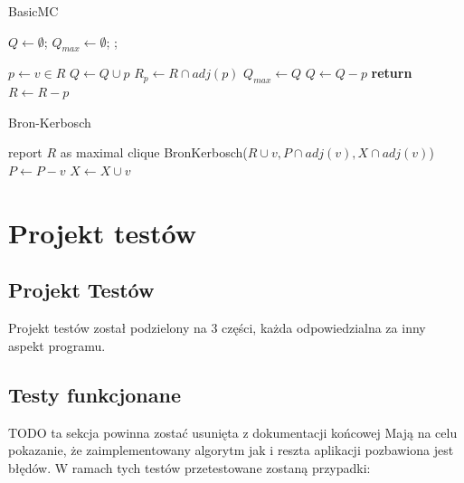 \documentclass[12pt, a4paper]{article}
\begin{document}
\begin{algorithm}
\caption{BasicMC}\label{basicmc}
\begin{algorithmic}[1]
  
\State $Q\gets \emptyset$;
\State $Q_{max}\gets \emptyset$;
\State {};
\EndProcedure
\Statex

  \State $p\gets v\in R$
    \State $Q \gets Q \cup {p}$\label{addPToQ}
    \State $R_p \gets R \cap adj(p)$
      \State {}
      \State $Q_{max} \gets Q$
    \EndIf
    \State $Q \gets Q - {p}$
  \Else
    \textbf{ return}\label{skip}
  \EndIf
  \State $R \gets R - p$
\EndWhile
\EndProcedure

\end{algorithmic}
\end{algorithm}

\begin{algorithm}
\caption{Bron-Kerbosch}\label{bron-kerbosch}
\begin{algorithmic}[1]
  
    \State report $R$ as maximal clique
  \EndIf
    \State BronKerbosch($R \cup v, P \cap adj(v), X \cap adj(v)$)
    \State $P \gets P - v$
    \State $X \gets X \cup v$
  \EndFor
\EndProcedure

\end{algorithmic}
\end{algorithm}


\section{Projekt testów}
\label{sec-4}

\subsection{Projekt Testów}
Projekt testów został podzielony na 3 części, każda odpowiedzialna za inny aspekt programu.

\subsection{Testy funkcjonane}
TODO ta sekcja powinna zostać usunięta z dokumentacji końcowej
Mają na celu pokazanie, że zaimplementowany algorytm jak i reszta aplikacji pozbawiona jest błędów. W ramach tych testów przetestowane zostaną przypadki:
\end{document}
